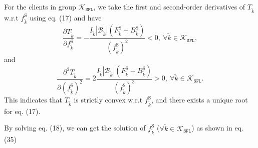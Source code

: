 \documentclass[10pt,journal,transmag]{IEEEtran}
\begin{document}
\begin{appendices}
For the clients in group $\mathcal{K}_{\texttt{SFL}}$, we take the first and second-order derivatives of $T_{\tilde{k}}$ w.r.t $f^\text{S}_{\tilde{k}}$ using eq. (17) and have
\begin{equation}
    \frac{\partial T_{\tilde{k}}}{\partial f^\text{S}_{\tilde{k}}} = - \frac{ I_{\tilde{k}} \left|\mathcal{B}_{\tilde{k}}\right| (F^\text{S}_{\tilde{k}} + B^\text{S}_{\tilde{k}}) }{ (f^\text{S}_{\tilde{k}})^2 } < 0,\ \forall \tilde{k} \in \mathcal{K}_{\texttt{SFL}}, 
\end{equation}
and
\begin{equation}
    \frac{\partial^2 T_{\tilde{k}}}{\partial (f^\text{S}_{\tilde{k}})^2}  = 2 \frac{ I_{\tilde{k}} \left|\mathcal{B}_{\tilde{k}}\right| (F^\text{S}_{\tilde{k}} + B^\text{S}_{\tilde{k}}) }{ (f^\text{S}_{\tilde{k}})^3} > 0,\ \forall \tilde{k} \in \mathcal{K}_{\texttt{SFL}}.
\end{equation}
This indicates that $T_{\tilde{k}}$ is strictly convex w.r.t $f^\text{S}_{\tilde{k}}$, and there exists a unique root for eq. (17).

By solving eq. (18), we can get the solution of $f^\text{S}_{\tilde{k}}$ ($\forall \tilde{k} \in \mathcal{K}_{\texttt{SFL}}$) as shown in eq. (35)


\end{appendices}
\end{document}
